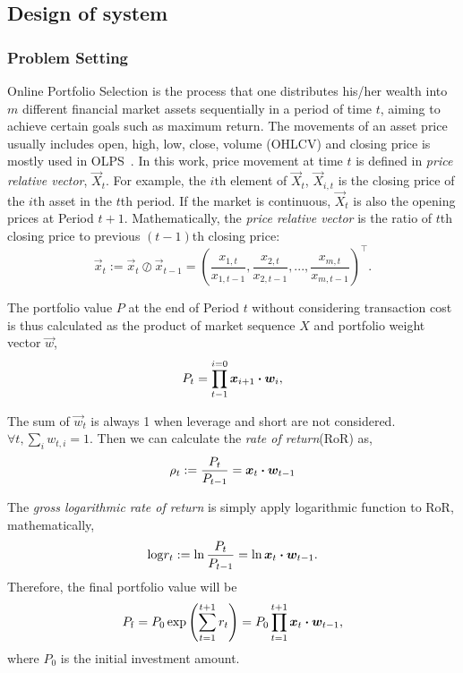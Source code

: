 \subsection{Design of system}
\label{sec: system}

\subsubsection{Problem Setting}
\label{sec: problem_settings}

Online Portfolio Selection is the process that one distributes his/her wealth into $m$ different financial market assets sequentially in a period of time $t$, aiming to achieve certain goals such as maximum return. The movements of an asset price usually includes open, high, low, close, volume (OHLCV) and closing price is mostly used in OLPS~\cite{li2014online}. In this work, price movement at time $t$ is defined in \emph{price relative vector}, $\vec X_{t}$. For example, the $i\mathrm{th}$ element of $\vec{X}_t$, $\vec{X}_{i,t}$ is the closing price of the $i\mathrm{th}$ asset in the $t$th period. If the market is continuous, $\vec{X}_t$ is also the opening prices at Period $t+1$. Mathematically, the \emph{price relative vector} is the ratio of $t$th closing price to previous $(t-1)$th closing price:
\begin{equation}
	\vec{x}_{t} := \vec{x}_{t} \oslash \vec{x}_{t-1} =
\left(\frac{ x_{1, t}}{x_{1, t-1}}, \frac{x_{2, t}}{x_{2, t-1}}, ..., \frac{x_{m, t}}{x_{m, t-1}} \right)^\intercal.
\label{eq:x}
\end{equation}

The portfolio value $P$ at the end of Period $t$ without considering transaction cost is thus calculated as the product of market sequence $X$ and portfolio weight vector $\vec w$,
\begin{equation} \label{eq:portfolio_value_t_no_cost}
    P_{t} = \prod_{t-1}^{i=0} \bm{x}_{i+1} \boldsymbol{\cdot} \bm{w}_{i},
\end{equation}

The sum of $\vec{w}_t$ is always 1 when leverage and short are not considered.
$\forall t, \sum\limits_i  w_{t,i} =1$. Then we can calculate the \emph{rate of return}(RoR) as, 
\begin{equation} \label{eq:rho_t_no_cost}
	\rho_{t} := \frac{P_{t}}{P_{t-1}} = \bm{x}_{t} \boldsymbol{\cdot} \bm{w}_{t-1}
\end{equation}

The \emph{gross logarithmic rate of return} is simply apply logarithmic function to RoR, mathematically,
\begin{equation} 
    \mathrm{log}r_{t} := \ln \frac{P_{t}}{P_{t-1}} = \ln \bm{x}_{t} \boldsymbol{\cdot} \bm{w}_{t-1}.
	\label{eq:log_r_no_cost}
\end{equation}
Therefore, the final portfolio value will be
\begin{equation}\label{eq:final_P_no_cost}
	P_\mathrm{f} = P_0 \exp\left( \sum\limits_{t=1}^{t+1} r_{t} \right) = P_0 \prod_{t=1}^{t+1} \bm{x}_{t} \boldsymbol{\cdot} \bm{w}_{t-1},
\end{equation}
where $P_0$ is the initial investment amount.

